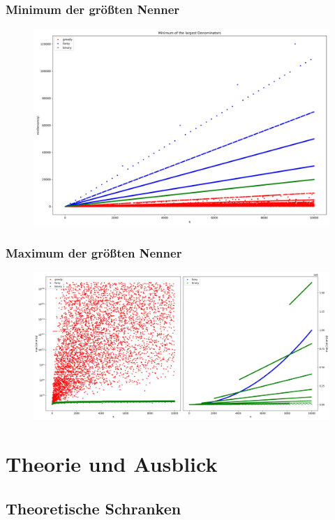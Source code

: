 \documentclass{beamer}
\begin{document}
\begin{frame}
\frametitle{Minimum der größten Nenner}
\begin{figure}[h]
	\includegraphics[width=\textwidth]{../LaTeX-Doc/images/minDenom.png}
\end{figure}
\end{frame}

\begin{frame}
\frametitle{Maximum der größten Nenner}
\begin{figure}[h]
	\includegraphics[width=\textwidth]{../LaTeX-Doc/images/maxDenom2in1.png}
\end{figure}
\end{frame}

\section{Theorie und Ausblick}
\subsection{Theoretische Schranken}
\end{document}
